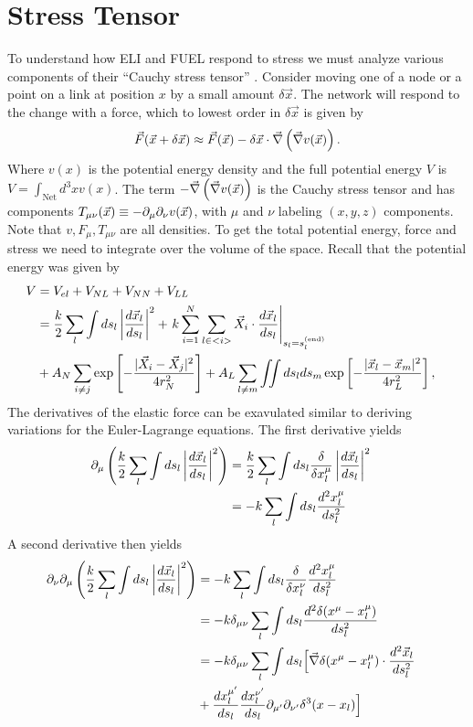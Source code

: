 \documentclass[nofootinbib,preprint,floatfix,titlepage,superscriptaddress]{revtex4} %
\begin{document}
\section{Stress Tensor\label{ap:stress}}
To understand how ELI and FUEL respond to stress we must analyze various components of their ``Cauchy stress tensor'' \citep{chaikin2000principles,landau1986theory}. 
Consider moving one of a node or a point on a link at position $x$ by a small amount $\delta \vec{x}$.
The network will respond to the change with a force, which to lowest order in $\delta \vec{x}$ is given by
\begin{equation}
\vec{F} (\vec{x}+\delta \vec{x}) \approx %
\vec{F} (\vec{x})-\delta \vec{x}\cdot  \vec{\del} \pr{\vec{\del} v (\vec{x})}.\label{eq:dF}    
\end{equation}
Where $v(x)$ is the potential energy density and the full potential energy $V$ is $V = \int_\mathrm{Net} d^3x v(x)$. 
The term $-\vec{\nabla} \left(\vec{\nabla} v (\vec{x})\right)$ is the Cauchy stress tensor and has components $T_{\mu\nu}(\vec{x}) \equiv -\partial_\mu\partial_\nu v(\vec{x})$, with $\mu$ and $\nu$ labeling $(x,y,z)$ components. 
Note that $v,F_\mu,T_{\mu\nu}$ are all densities. 
To get the total potential energy, force and stress we need to integrate over the volume of the space. 
Recall that the potential energy was given by 
\begin{align}
    V &= V_{el} + V_{NL} +V_{NN} + V_{LL} \cr 
    &= {k\over 2}\sum_l\int ds_l \left|{d\vec{x}_l\over ds_l} \right|^2 + 
    \left. k\sum_{i=1}^N  \sum_{l\in <i>}  \vec{X}_i \cdot{d\vec{x}_l%
    \over ds_l}\right|_{s_l = s_l^{(\mathrm{end})}}
    \cr
    &+ A_N\sum_{i\ne j}  \exp\left[- {|\vec{X}_i-\vec{X}_j|^2 \over 4r_N^2}\right]+A_L\sum_{l\ne m} \iint ds_lds_m 
    \exp\left[- {|\vec{x}_l-\vec{x}_m|^2 \over 4 r_L^2}\right] ,
 \label{eq:Vfull1}
\end{align}
The derivatives of the elastic force can be exavulated similar to deriving variations for the Euler-Lagrange equations. 
The first derivative yields
\begin{align}
    \partial_\mu\left( {k\over 2}\sum_l\int ds_l \left|{d\vec{x}_l\over ds_l} \right|^2 \right) & = {k\over 2}\sum_l\int ds_l {\delta \over \delta x_l^\mu} \left|{d\vec{x}_l\over ds_l} \right|^2 \cr
    & = -{k}\sum_l\int ds_l {d^2 x_l^\mu\over ds_l^2} 
\end{align}
A second derivative then yields
\begin{align}
    \ro_\nu \ro_\mu \pr{{k\over 2}\sum_l\int ds_l \left|{d\vec{x}_l\over ds_l} \right|^2 }
    & = -{k}\sum_l\int ds_l {\delta \over \delta x_l^\nu} {d^2 x_l^\mu\over ds_l^2} \cr 
    & = -{k}\delta_{\mu\nu} \sum_l\int ds_l {d^2 \delta(x^\mu-x_l^\mu )\over ds_l^2} \cr
    & = -{k}\delta_{\mu\nu} \sum_l\int ds_l\Big[ \vec{\del} \delta(x^\mu-x_l^\mu) \cdot {d^2 \vec{x}_l\over ds_l^2} \cr 
    & + {d x_l^{\mu'}\over ds_l}{d x_l^{\nu'}\over ds_l} \ro_{\mu'}\ro_{\nu'} \delta^3(x-x_l)  \Big] %
\end{align}
\end{document}
